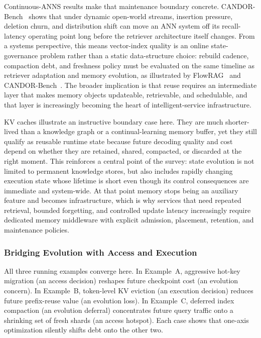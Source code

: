 \documentclass[acmsmall,screen,review]{acmart}
\begin{document}
Continuous-ANNS results make that maintenance boundary concrete. CANDOR-Bench~\cite{wang2026candor} shows that under dynamic open-world streams, insertion pressure, deletion churn, and distribution shift can move an ANN system off its recall-latency operating point long before the retriever architecture itself changes. From a systems perspective, this means vector-index quality is an online state-governance problem rather than a static data-structure choice: rebuild cadence, compaction debt, and freshness policy must be evaluated on the same timeline as retriever adaptation and memory evolution, as illustrated by FlowRAG~\cite{zhang2026flowrag} and CANDOR-Bench~\cite{wang2026candor}. The broader implication is that reuse requires an intermediate layer that makes memory objects updateable, retrievable, and schedulable, and that layer is increasingly becoming the heart of intelligent-service infrastructure.

KV caches illustrate an instructive boundary case here. They are much shorter-lived than a knowledge graph or a continual-learning memory buffer, yet they still qualify as reusable runtime state because future decoding quality and cost depend on whether they are retained, shared, compacted, or discarded at the right moment. This reinforces a central point of the survey: state evolution is not limited to permanent knowledge stores, but also includes rapidly changing execution state whose lifetime is short even though its control consequences are immediate and system-wide. At that point memory stops being an auxiliary feature and becomes infrastructure, which is why services that need repeated retrieval, bounded forgetting, and controlled update latency increasingly require dedicated memory middleware with explicit admission, placement, retention, and maintenance policies.

\subsubsection{Bridging Evolution with Access and Execution}

All three running examples converge here. In Example~A, aggressive hot-key migration (an access decision) reshapes future checkpoint cost (an evolution concern). In Example~B, token-level KV eviction (an execution decision) reduces future prefix-reuse value (an evolution loss). In Example~C, deferred index compaction (an evolution deferral) concentrates future query traffic onto a shrinking set of fresh shards (an access hotspot). Each case shows that one-axis optimization silently shifts debt onto the other two.
\end{document}
